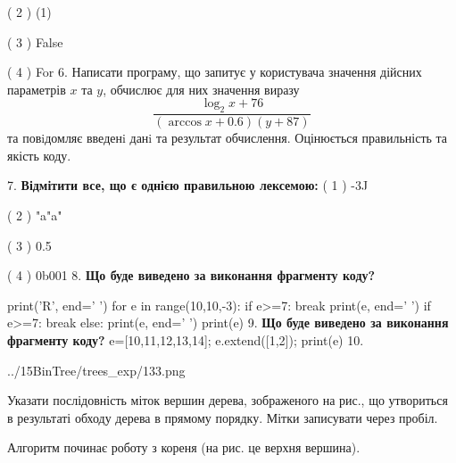 \documentclass[11pt]{article}
\begin{document}
( 2 ) (1)

( 3 ) False

( 4 ) For
\vspace{5mm}
6. 
Написати програму, що запитує у користувача значення дійсних параметрів $x$ та $y$, обчислює для них значення виразу 
$$\frac{\log_{2} x + 76}{(\arccos x + 0.6) (y + 87)}$$ 
та повiдомляє введенi данi та результат обчислення.
 Оцінюється правильність та якість коду.

\vspace{5mm}
7. %
\textbf{Відмітити все, що є однією правильною лексемою:}
( 1 ) -3J

( 2 ) "a"a"

( 3 ) 0.5

( 4 ) 0b001
\vspace{5mm}
8. \textbf{Що буде виведено за виконання фрагменту коду?}

print('R', end=' ')
for e in range(10,10,-3):
    if e>=7:
        break
        print(e, end=' ')
    if e>=7:
        break
    else:
        print(e, end=' ')
    print(e)
\vspace{5mm}
9. \textbf{Що буде виведено за виконання фрагменту коду?}
e=[10,11,12,13,14]; e.extend([1,2]); print(e)\vspace{5mm}
10. 

\begin{center}
	{../15BinTree/trees_exp/133.png}
\end{center}
Указати послідовність міток вершин дерева, зображеного на рис., що утвориться в результаті обходу дерева в прямому порядку. Мітки записувати через пробіл.\par Алгоритм починає роботу з кореня (на рис. це верхня вершина).
\vspace{5mm}










\newpage
\end{document}
